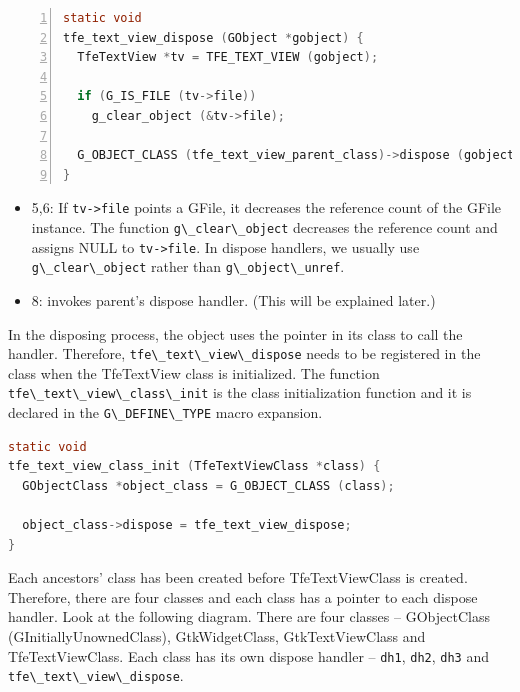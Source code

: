 \begin{lstlisting}[language=C, numbers=left]
static void
tfe_text_view_dispose (GObject *gobject) {
  TfeTextView *tv = TFE_TEXT_VIEW (gobject);

  if (G_IS_FILE (tv->file))
    g_clear_object (&tv->file);

  G_OBJECT_CLASS (tfe_text_view_parent_class)->dispose (gobject);
}
\end{lstlisting}

\begin{itemize}
\tightlist
\item
  5,6: If \passthrough{\lstinline!tv->file!} points a GFile, it
  decreases the reference count of the GFile instance. The function
  \passthrough{\lstinline!g\_clear\_object!} decreases the reference
  count and assigns NULL to \passthrough{\lstinline!tv->file!}. In
  dispose handlers, we usually use
  \passthrough{\lstinline!g\_clear\_object!} rather than
  \passthrough{\lstinline!g\_object\_unref!}.
\item
  8: invokes parent's dispose handler. (This will be explained later.)
\end{itemize}

In the disposing process, the object uses the pointer in its class to
call the handler. Therefore,
\passthrough{\lstinline!tfe\_text\_view\_dispose!} needs to be
registered in the class when the TfeTextView class is initialized. The
function \passthrough{\lstinline!tfe\_text\_view\_class\_init!} is the
class initialization function and it is declared in the
\passthrough{\lstinline!G\_DEFINE\_TYPE!} macro expansion.

\begin{lstlisting}[language=C]
static void
tfe_text_view_class_init (TfeTextViewClass *class) {
  GObjectClass *object_class = G_OBJECT_CLASS (class);

  object_class->dispose = tfe_text_view_dispose;
}
\end{lstlisting}

Each ancestors' class has been created before TfeTextViewClass is
created. Therefore, there are four classes and each class has a pointer
to each dispose handler. Look at the following diagram. There are four
classes -- GObjectClass (GInitiallyUnownedClass), GtkWidgetClass,
GtkTextViewClass and TfeTextViewClass. Each class has its own dispose
handler -- \passthrough{\lstinline!dh1!}, \passthrough{\lstinline!dh2!},
\passthrough{\lstinline!dh3!} and
\passthrough{\lstinline!tfe\_text\_view\_dispose!}.

